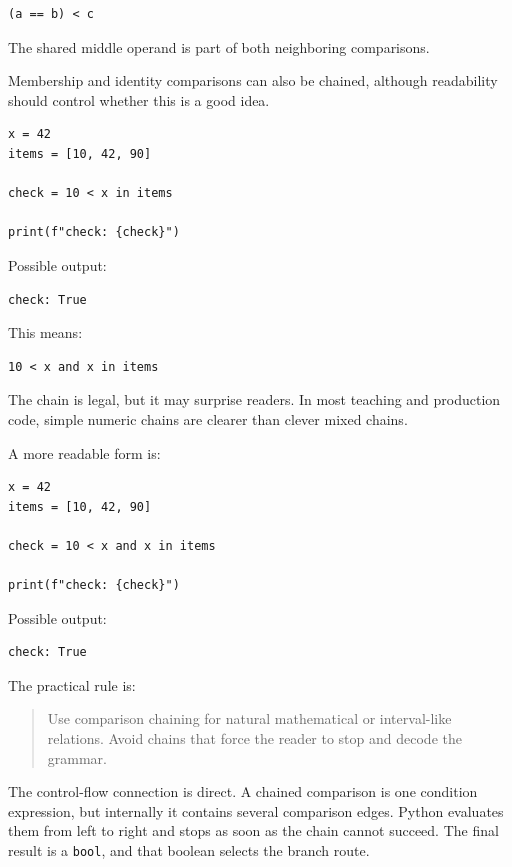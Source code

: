 \begin{verbatim}
(a == b) < c
\end{verbatim}

The shared middle operand is part of both neighboring comparisons.

Membership and identity comparisons can also be chained, although readability should control whether this is a good idea.

\begin{verbatim}
x = 42
items = [10, 42, 90]

check = 10 < x in items

print(f"check: {check}")
\end{verbatim}

Possible output:

\begin{verbatim}
check: True
\end{verbatim}

This means:

\begin{verbatim}
10 < x and x in items
\end{verbatim}

The chain is legal, but it may surprise readers. In most teaching and production code, simple numeric chains are clearer than clever mixed chains.

A more readable form is:

\begin{verbatim}
x = 42
items = [10, 42, 90]

check = 10 < x and x in items

print(f"check: {check}")
\end{verbatim}

Possible output:

\begin{verbatim}
check: True
\end{verbatim}

The practical rule is:

\begin{quote}
Use comparison chaining for natural mathematical or interval-like relations. Avoid chains that force the reader to stop and decode the grammar.
\end{quote}

The control-flow connection is direct. A chained comparison is one condition expression, but internally it contains several comparison edges. Python evaluates them from left to right and stops as soon as the chain cannot succeed. The final result is a \texttt{bool}, and that boolean selects the branch route.
